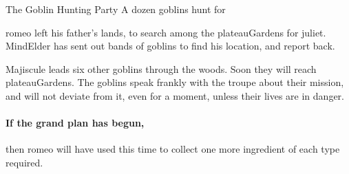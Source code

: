 \begin{multicols}{2}
{The Goblin Hunting Party}%
{A dozen goblins hunt for }%

\Gls{romeo} left his father's lands, to search among the \gls{plateauGardens} for \gls{juliet}.
\Gls{MindElder} has sent out bands of goblins to find his location, and report back.

Majiscule leads six other goblins through the woods.
Soon they will reach \gls{plateauGardens}.
The goblins speak frankly with the troupe about their mission, and will not deviate from it, even for a moment, unless their lives are in danger.

\paragraph{If the grand plan has begun,}
then \gls{romeo} will have used this time to collect one more \gls{ingredient} of each type required.

\end{multicols}
